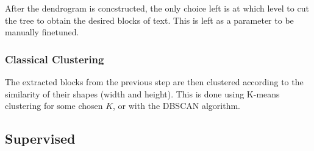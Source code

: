 After the dendrogram is concstructed, the only choice left is at which level to
cut the tree to obtain the desired blocks of text. This is left as a parameter
to be manually finetuned.

\subsubsection*{Classical Clustering}
The extracted blocks from the previous step are then clustered according to
the similarity of their shapes (width and height). This is done using K-means
clustering for some chosen $K$, or with the DBSCAN algorithm.
\subsection*{Supervised}
